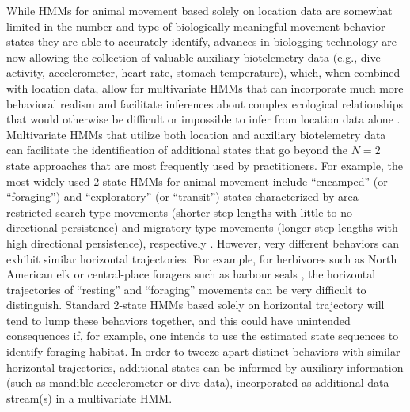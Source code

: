 \documentclass[12pt]{article}\usepackage[]{graphicx}\usepackage[]{xcolor}
\begin{document}
While HMMs for animal movement based solely on location data are somewhat limited in the number and type of biologically-meaningful movement behavior states they are able to accurately identify, advances in biologging technology are now allowing the collection of valuable auxiliary biotelemetry data (e.g., dive activity, accelerometer, heart rate, stomach temperature), which, when combined with location data, allow for multivariate HMMs that can incorporate much more behavioral realism and facilitate inferences about complex ecological relationships that would otherwise be difficult or impossible to infer from location data alone \citep[e.g.][]{McClintockEtAl2013c,DeRuiterEtAl2017,McClintockEtAl2017}.  Multivariate HMMs that utilize both location and auxiliary biotelemetry data can facilitate the identification of additional states that go beyond the $N=2$ state approaches that are most frequently used by practitioners. For example, the most widely used 2-state HMMs for animal movement include ``encamped'' (or ``foraging'') and ``exploratory'' (or ``transit'') states characterized by area-restricted-search-type movements (shorter step lengths with little to no directional persistence) and migratory-type movements (longer step lengths with high directional persistence), respectively \citep{MoralesEtAl2004,JonsenEtAl2005}.  However, very different behaviors can exhibit similar horizontal trajectories.  For example, for herbivores such as North American elk \citep{MoralesEtAl2004} or central-place foragers such as harbour seals \citep{McClintockEtAl2013c}, the horizontal trajectories of ``resting'' and ``foraging'' movements can be very difficult to distinguish. Standard 2-state HMMs based solely on horizontal trajectory will tend to lump these behaviors together, and this could have unintended consequences if, for example, one intends to use the estimated state sequences to identify foraging habitat. In order to tweeze apart distinct behaviors with similar horizontal trajectories, additional states can be informed by auxiliary information (such as mandible accelerometer or dive data), incorporated as additional data stream(s) in a multivariate HMM.
\end{document}
